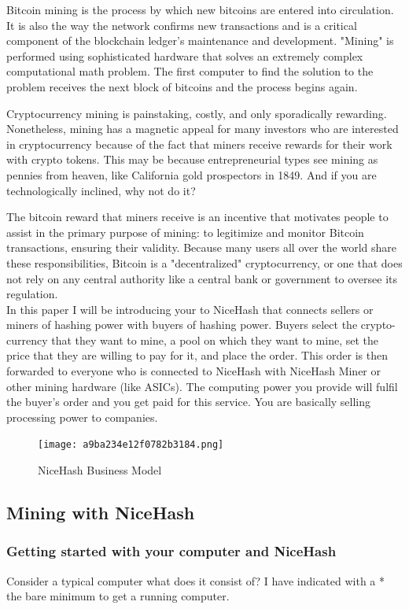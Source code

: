 Bitcoin mining is the process by which new bitcoins are entered into circulation. It is also the way the network confirms new transactions and is a critical component of the blockchain ledger's maintenance and development. "Mining" is performed using sophisticated hardware that solves an extremely complex computational math problem. The first computer to find the solution to the problem receives the next block of bitcoins and the process begins again.

Cryptocurrency mining is painstaking, costly, and only sporadically rewarding. Nonetheless, mining has a magnetic appeal for many investors who are interested in cryptocurrency because of the fact that miners receive rewards for their work with crypto tokens. This may be because entrepreneurial types see mining as pennies from heaven, like California gold prospectors in 1849. And if you are technologically inclined, why not do it?

The bitcoin reward that miners receive is an incentive that motivates people to assist in the primary purpose of mining: to legitimize and monitor Bitcoin transactions, ensuring their validity. Because many users all over the world share these responsibilities, Bitcoin is a "decentralized" cryptocurrency, or one that does not rely on any central authority like a central bank or government to oversee its regulation. \\

In this paper I will be introducing your to NiceHash that connects sellers or miners of hashing power with buyers of hashing power. Buyers select the crypto-currency that they want to mine, a pool on which they want to mine, set the price that they are willing to pay for it, and place the order. This order is then forwarded to everyone who is connected to NiceHash with NiceHash Miner or other mining hardware (like ASICs). The computing power you provide will fulfil the buyer's order and you get paid for this service. You are basically selling processing power to companies.

\begin{figure}[H]
\centering
\texttt{[image: a9ba234e12f0782b3184.png]}
\caption{NiceHash Business Model}
\label{fig:nicehash}
\end{figure}

\subsection{Mining with NiceHash}

\subsubsection{Getting started with your computer and NiceHash} 
Consider a typical computer what does it consist of? I have indicated with a * the bare minimum to get a running computer.

